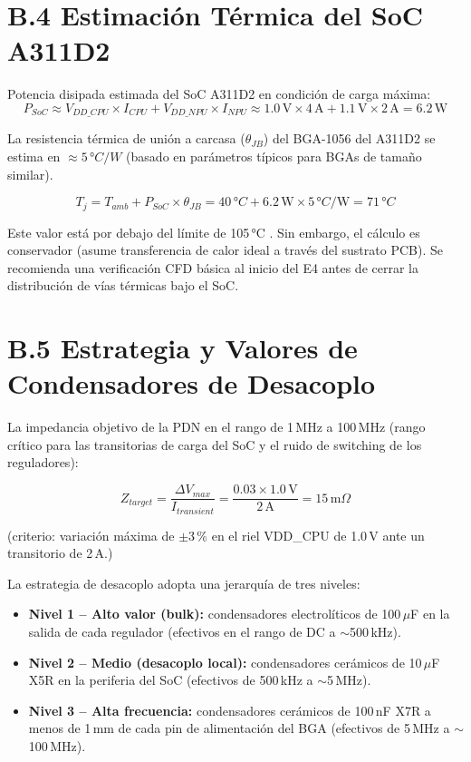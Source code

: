 \section*{B.4 Estimación Térmica del SoC A311D2}

Potencia disipada estimada del SoC A311D2 en condición de carga máxima:
\[
  P_{SoC} \approx V_{DD\_CPU} \times I_{CPU} + V_{DD\_NPU} \times I_{NPU} \approx 1.0\,\text{V} \times 4\,\text{A} + 1.1\,\text{V} \times 2\,\text{A} = 6.2\,\text{W}
\]

La resistencia térmica de unión a carcasa ($\theta_{JB}$) del BGA-1056 del A311D2 se estima en $\approx 5\,°C/W$ (basado en parámetros típicos para BGAs de tamaño similar).

\[
  T_j = T_{amb} + P_{SoC} \times \theta_{JB} = 40\,°C + 6.2\,\text{W} \times 5\,°C/\text{W} = 71\,°C
\]

Este valor está por debajo del límite de 105\,°C . Sin embargo, el cálculo es conservador (asume transferencia de calor ideal a través del sustrato PCB). Se recomienda una verificación CFD básica al inicio del E4 antes de cerrar la distribución de vías térmicas bajo el SoC.

\section*{B.5 Estrategia y Valores de Condensadores de Desacoplo}

La impedancia objetivo de la PDN en el rango de 1\,MHz a 100\,MHz (rango crítico para las transitorias de carga del SoC y el ruido de switching de los reguladores):

\[
  Z_{target} = \frac{\Delta V_{max}}{I_{transient}} = \frac{0.03 \times 1.0\,\text{V}}{2\,\text{A}} = 15\,\text{m}\Omega
\]

(criterio: variación máxima de $\pm$3\,\% en el riel VDD\_CPU de 1.0\,V ante un transitorio de 2\,A.)

La estrategia de desacoplo adopta una jerarquía de tres niveles:
\begin{itemize}
  \item \textbf{Nivel 1 -- Alto valor (bulk):} condensadores electrolíticos de 100\,$\mu$F en la salida de cada regulador (efectivos en el rango de DC a $\sim$500\,kHz).
  \item \textbf{Nivel 2 -- Medio (desacoplo local):} condensadores cerámicos de 10\,$\mu$F X5R en la periferia del SoC (efectivos de 500\,kHz a $\sim$5\,MHz).
  \item \textbf{Nivel 3 -- Alta frecuencia:} condensadores cerámicos de 100\,nF X7R a menos de 1\,mm de cada pin de alimentación del BGA (efectivos de 5\,MHz a $\sim$100\,MHz).
\end{itemize}

